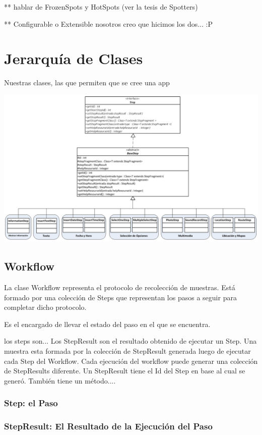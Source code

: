 ** hablar de FrozenSpots y HotSpots (ver la tesis de Spotters)


** Configurable o Extensible nosotros creo que hicimos los dos... :P

\section{Jerarquía de Clases}
Nuestras clases, las que permiten que se cree una app

\includegraphics[scale=0.4]{05-implementacion/Steps.png} 


\subsection{Workflow}
La clase Workflow representa el protocolo de recolección de muestras. Está formado por una colección de Steps que representan los pasos a seguir para completar dicho protocolo.


Es el encargado de llevar el estado del paso en el que se encuentra.



los steps son...
Los StepResult son el resultado obtenido de ejecutar un Step.
Una muestra esta formada por la colección de StepResult generada luego de ejecutar cada Step del Workflow. Cada ejecución del workflow puede generar una colección de StepResults diferente.
Un StepResult tiene el Id del Step en base al cual se generó. También tiene un método....

\subsubsection{Step: el Paso}

\subsubsection{StepResult: El Resultado de la Ejecución del Paso}

